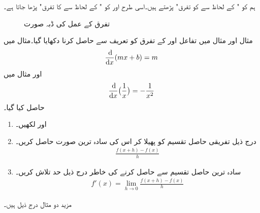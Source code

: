 ہم  کو " کے لحاظ سے  کو تفرق" پڑھتے ہیں۔اسی طرح  اور  کو " کے لحاظ سے  کا تفرق" پڑھا جاتا ہے۔
\begin{figure}
\centering
{}
\caption{تفرق کے عمل کی ڈبہ صورت}
\label{شکل_تفرق_ڈبہ_صورت}
\end{figure}

مثال  اور مثال  میں تفاعل  اور  کے تفرق کو تعریف سے حاصل کرنا دکھایا گیا۔مثال  میں 
\begin{align*}
\frac{\dif}{\dif x}(mx+b)=m
\end{align*}
اور   مثال  میں
\begin{align}
\frac{\dif}{\dif x}\big(\frac{1}{x}\big)=-\frac{1}{x^2}
\end{align}
حاصل کیا گیا۔

\begin{enumerate}[1.]

\item
{} اور  لکھیں۔
\item
درج ذیل تفریقی حاصل تقسیم کو پھیلا کر اس کی سادہ ترین صورت حاصل کریں۔
\begin{align*}
\frac{f(x+h)-f(x)}{h}
\end{align*}
\item
سادہ ترین حاصل تقسیم سے  حاصل کرنے کی خاطر درج ذیل حد تلاش کریں۔
\begin{align*}
f'(x)=\lim_{h\to 0}\frac{f(x+h)-f(x)}{h}
\end{align*}
\end{enumerate}

مزید دو مثال درج ذیل ہیں۔


